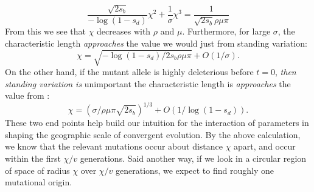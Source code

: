 \documentclass{article}
\newcommand{\gc}[1]{{\it\color{blue} #1} }
\begin{document}
\begin{equation} \label{eqn:defines_chi}
   \frac{\sqrt{2s_b} }{-\log(1-s_d) } \chi^2 + \frac{1}{\sigma} \chi^3 = \frac{1}{\sqrt{2s_b} \rho\mu\pi}
\end{equation}
From this we see that $\chi$ decreases with $\rho$ and $\mu$.
Furthermore, for large $\sigma$, the characteristic length \gc{approaches}
the value we would just from standing variation:
\begin{equation} \label{eqn:chi_standing}
\chi = \sqrt{ -\log(1-s_d) / 2 s_b \rho \mu \pi } + O(1/\sigma).
\end{equation}
On the other hand, if the mutant allele is highly deleterious before $t=0$,
\gc{then standing variation is} unimportant the characteristic length is \gc{approaches} the value from \citet{ralphcoop2010}:
\begin{equation} \label{eqn:chi_new}
\chi = ( \sigma / \rho \mu \pi \sqrt{2 s_b} )^{1/3} + O(1/\log(1-s_d)).
\end{equation}
These two end points help build our intuition for the interaction of
parameters in shaping the geographic scale of convergent evolution.
By the above calculation, we know that the relevant mutations occur about distance $\chi$ apart, 
 and occur within the first $\chi/v$ generations.
 Said another way, if we look in a circular region of space of radius $\chi$ over $\chi/v$ generations,
 we expect to find roughly one mutational origin.


\end{document}
